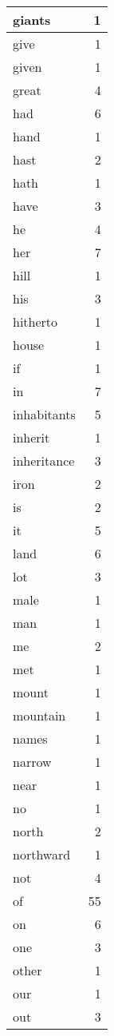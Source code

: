 \begin{center}
\begin{longtable}{l|r}
giants & 1 \\ \hline
give & 1 \\ \hline
given & 1 \\ \hline
great & 4 \\ \hline
had & 6 \\ \hline
hand & 1 \\ \hline
hast & 2 \\ \hline
hath & 1 \\ \hline
have & 3 \\ \hline
he & 4 \\ \hline
her & 7 \\ \hline
hill & 1 \\ \hline
his & 3 \\ \hline
hitherto & 1 \\ \hline
house & 1 \\ \hline
if & 1 \\ \hline
in & 7 \\ \hline
inhabitants & 5 \\ \hline
inherit & 1 \\ \hline
inheritance & 3 \\ \hline
iron & 2 \\ \hline
is & 2 \\ \hline
it & 5 \\ \hline
land & 6 \\ \hline
lot & 3 \\ \hline
male & 1 \\ \hline
man & 1 \\ \hline
me & 2 \\ \hline
met & 1 \\ \hline
mount & 1 \\ \hline
mountain & 1 \\ \hline
names & 1 \\ \hline
narrow & 1 \\ \hline
near & 1 \\ \hline
no & 1 \\ \hline
north & 2 \\ \hline
northward & 1 \\ \hline
not & 4 \\ \hline
of & 55 \\ \hline
on & 6 \\ \hline
one & 3 \\ \hline
other & 1 \\ \hline
our & 1 \\ \hline
out & 3 \\ \hline

\end{longtable}
\end{center}
